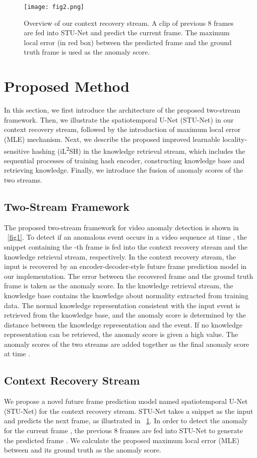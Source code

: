 \documentclass[lettersize,journal]{IEEEtran}
\begin{document}
\begin{figure}[!t]
	\centering
	\texttt{[image: fig2.png]}
	\caption{Overview of our context recovery stream. A clip of previous 8 frames are fed into STU-Net and predict the current frame. The maximum local error (in red box) between the predicted frame and the ground truth frame is used as the anomaly score.}
	\label{fig2}
\end{figure}

\section{Proposed Method}
In this section, we first introduce the architecture of the proposed two-stream framework.
Then, we illustrate the spatiotemporal U-Net (STU-Net) in our context recovery stream, followed by the introduction of maximum local error (MLE) mechanism.
Next, we describe the proposed improved learnable locality-sensitive hashing (iL\textsuperscript{2}SH) in the knowledge retrieval stream, which includes the sequential processes of training hash encoder, constructing knowledge base and retrieving knowledge.
Finally, we introduce the fusion of anomaly scores of the two streams.

\subsection{Two-Stream Framework}
The proposed two-stream framework for video anomaly detection is shown in \figurename~\ref{fig1}.
To detect if an anomalous event occurs in a video sequence at time , the snippet containing the -th frame is fed into the context recovery stream and the knowledge retrieval stream, respectively.
In the context recovery stream, the input is recovered by an encoder-decoder-style future frame prediction model in our implementation.
The error between the recovered frame and the ground truth frame is taken as the anomaly score.
In the knowledge retrieval stream, the knowledge base contains the knowledge about normality extracted from training data.
The normal knowledge representation consistent with the input event is retrieved from the knowledge base, and the anomaly score is determined by the distance between the knowledge representation and the event.
If no knowledge representation can be retrieved, the anomaly score is given a high value.
The anomaly scores of the two streams are added together as the final anomaly score at time .

\subsection{Context Recovery Stream}
We propose a novel future frame prediction model named spatiotemporal U-Net (STU-Net) for the context recovery stream.
STU-Net takes a snippet as the input and predicts the next frame, as illustrated in \figurename~\ref{fig2}.
In order to detect the anomaly for the current frame , the previous 8 frames  are fed into STU-Net to generate the predicted frame . 
We calculate the proposed maximum local error (MLE) between  and its ground truth  as the anomaly score.
\end{document}
